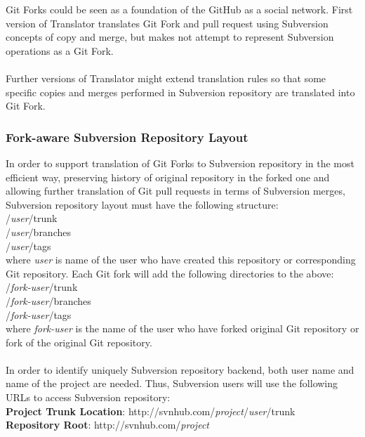Git Forks could be seen as a foundation of the GitHub as a social network. 
First version of Translator translates Git Fork and pull request using Subversion concepts of copy and merge,
but makes not attempt to represent Subversion operations as a Git Fork.\\\\
Further versions of Translator might extend translation
rules so that some specific copies and merges performed in Subversion repository are translated into Git Fork.

\subsubsection{Fork-aware Subversion Repository Layout}

In order to support translation of Git Forks to Subversion repository in the most efficient way, 
preserving history of original repository in the forked one and allowing further translation of
Git pull requests in terms of Subversion merges, 
Subversion repository layout must have the following structure:\\

/\emph{user}/trunk\\
/\emph{user}/branches\\
/\emph{user}/tags\\

where \emph{user} is name of the user who have created this repository or 
corresponding Git repository. Each Git fork will add the following directories to the above:\\

/\emph{fork-user}/trunk\\
/\emph{fork-user}/branches\\
/\emph{fork-user}/tags\\

where \emph{fork-user} is the name of the user who have forked original Git repository or fork of the original Git repository.
\\\\
In order to identify uniquely Subversion repository backend, both user name and name of the project are needed. Thus,
Subversion users will use the following URLs to access Subversion repository:\\

\textbf{Project Trunk Location}: http://svnhub.com/\emph{project}/\emph{user}/trunk\\
\textbf{Repository Root}: http://svnhub.com/\emph{project}\\

